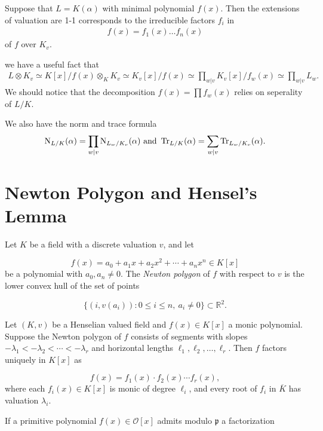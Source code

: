 {\np Suppose that $L=K(\alpha)$ with minimal polynomial $f(x)$. Then the extensions of valuation are 1-1 corresponds to the irreducible factors $f_i$ in 
\begin{align*}
    f(x) = f_1(x)\dots f_n(x)
\end{align*}
of $f$ over $K_v$.

\np we have a useful fact that 
\begin{align*}
L\otimes K_v\simeq K[x]/f(x)    \otimes_K K_v\simeq K_v[x]/f(x)\simeq \prod_{w|v} K_v[x]/f_w(x)\simeq  \prod_{w|v} L_w.
\end{align*} 
We should notice that the decomposition $f(x)=\prod f_w(x)$ relies on seperality of $L/K$.

\np We also have the norm and trace formula 
\begin{align*}
    \operatorname{N}_{L/K}(\alpha) = \prod_{w|v} \operatorname{N}_{L_w/K_v}(\alpha) \text{ and }  \operatorname{Tr}_{L/K}(\alpha) = \sum_{w|v}\operatorname{Tr}_{L_w/K_v}(\alpha).
\end{align*}


\section*{Newton Polygon and Hensel's Lemma}
\begin{definition}
Let $K$ be a field with a discrete valuation $v$, and let

\[
f(x) = a_0 + a_1 x + a_2 x^2 + \cdots + a_n x^n \in K[x]
\]
be a polynomial with $a_0, a_n \neq 0$. The \emph{Newton polygon} of $f$ 
with respect to $v$ is the lower convex hull of the set of points

\[
\bigl\{ (i, v(a_i)) : 0 \leq i \leq n,\ a_i \neq 0 \bigr\} \subset \mathbb{R}^2.
\]
\end{definition}
\begin{theorem}
Let $(K, v)$ be a Henselian valued field and $f(x) \in K[x]$ a monic 
polynomial. Suppose the Newton polygon of $f$ consists of segments with 
slopes $-\lambda_1 < -\lambda_2 < \cdots < -\lambda_r$ and horizontal 
lengths $\ell_1, \ell_2, \ldots, \ell_r$. Then $f$ factors uniquely in 
$K[x]$ as

\[
f(x) = f_1(x) \cdot f_2(x) \cdots f_r(x),
\]
where each $f_i(x) \in K[x]$ is monic of degree $\ell_i$, and every root 
of $f_i$ in $\overline{K}$ has valuation $\lambda_i$.
\end{theorem}

\begin{lemma}
If a primitive polynomial $f(x) \in \mathcal{O}[x]$ admits modulo $\mathfrak{p}$ 
a factorization


\end{lemma}}
